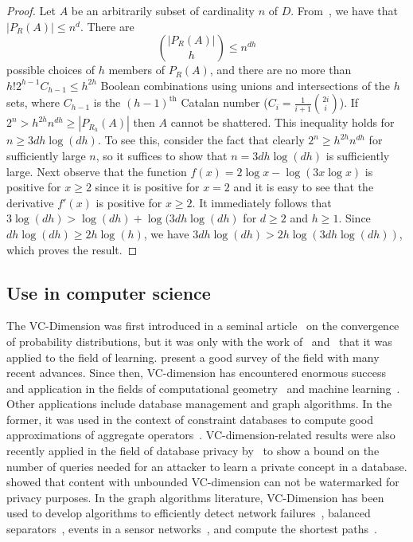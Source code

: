 \begin{proof}
  Let $A$ be an arbitrarily subset of cardinality $n$ of $D$.
  From~\citep[Coroll.~14.4.2]{AlonS08}, we have that $|P_R(A)|\le n^d$. There are 
  \[
  \binom{|P_R(A)|}{h}\le  n^{dh} \]
  possible choices of $h$ members of $P_R(A)$, and there are no more
  than $ h! 2^{h-1} C_{h-1}\leq h^{2h}$
  Boolean combinations using unions and intersections of the $h$ sets, where
  $C_{h-1}$ is the $(h-1)^{\mathrm{th}}$ Catalan number
  ($C_i=\frac{1}{i+1}\binom{2i}{i}$). If $2^n> h^{2h}n^{dh} \geq |P_{R_h}(A)|$
  then $A$ cannot be shattered. This inequality holds for $n\ge 3dh\log(dh)$. To
  see this, consider the fact that clearly $2^n\ge h^{2h}n^{dh}$ for
  sufficiently large $n$, so it suffices to show that $n=3dh\log(dh)$ is
  sufficiently large. Next observe that the function $f(x)=2\log x-\log(3x\log
  x)$ is positive for $x\ge 2$ since it is positive for $x=2$ and it is easy to
  see that the derivative $f'(x)$ is positive for $x\ge 2$. It immediately
  follows that $3\log(dh)> \log(dh)+\log(3dh\log(dh)$ for $d\ge2$ and $h\ge1$.
  Since $dh\log(dh)\ge 2h\log(h)$, we have $3dh\log(dh)> 2h\log(3dh\log(dh))$,
  which proves the result.
\end{proof}

\subsection{Use in computer science}
The VC-Dimension was first introduced in a seminal
article~\citep{VapnikC71} on the convergence of probability distributions, but it
was only with the work of~\citet{HausslerW86} and~\citet{BlumerEHW89} that it
was applied to the field of learning. \citet{BoucheronBL05} present a good survey
of the field with many recent advances. Since then, VC-dimension has encountered
enormous success and application in the fields of computational
geometry~\citep{Chazelle00,Matousek02} and machine
learning~\citep{AnthonyB99,DevroyeGL96}. Other applications include
database management and graph algorithms. 
In the former, it was used in the context of constraint databases to compute
good approximations of aggregate operators~\citep{BenediktL02}.
VC-dimension-related results were also recently applied in the field of database
privacy by~\citet{BlumLR08} to show a bound on the number of queries needed for
an attacker to learn a private concept in a database. \citet{Gross11} showed
that content with unbounded VC-dimension can not be watermarked for privacy
purposes. In the graph algorithms literature, VC-Dimension has been used to
develop algorithms to efficiently detect network
failures~\citep{Kleinberg03,KleinbergSS08}, balanced separators~\citep{FeigeM06},
events in a sensor networks~\citep{GandhiSW10}, and compute the shortest
paths~\citep{AbrahamDFGW11}.


